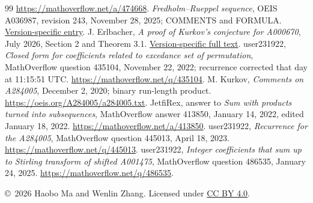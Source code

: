 \documentclass[11pt]{article}
\begin{document}
\begin{thebibliography}{99}
\url{https://mathoverflow.net/a/474668}.
 \emph{Fredholm--Rueppel sequence}, OEIS A036987,
revision 243, November 28, 2025; COMMENTS and FORMULA.
\href{https://raw.githubusercontent.com/oeis/oeisdata/d8ad22d9b98d2c427be8c6cd9f2672c600b8e3ae/seq/A036/A036987.seq}{Version-specific entry}.
 J. Erlbacher, \emph{A proof of Kurkov's conjecture for
A000670}, July 2026, Section 2 and Theorem 3.1.
\href{https://raw.githubusercontent.com/demonstrandum-research/artifacts/de462739d3afc6bfb3316d69a840ab4f75007aa9/papers/kurkov-a000670/note.pdf}{Version-specific full text}.
 user231922, \emph{Closed form for coefficients related
to excedance set of permutation}, MathOverflow question 435104,
November 22, 2022; recurrence corrected that day at 11:15:51 UTC.
\url{https://mathoverflow.net/q/435104}.
 M. Kurkov, \emph{Comments on A284005},
December 2, 2020; binary run-length product.
\url{https://oeis.org/A284005/a284005.txt}.
 JetfiRex, answer to \emph{Sum with products turned
into subsequences}, MathOverflow answer 413850, January 14, 2022,
edited January 18, 2022. \url{https://mathoverflow.net/a/413850}.
 user231922, \emph{Recurrence for the A284005},
MathOverflow question 445013, April 18, 2023.
\url{https://mathoverflow.net/q/445013}.
 user231922, \emph{Integer coefficients that sum up to
Stirling transform of shifted A001475}, MathOverflow question 486535,
January 24, 2025. \url{https://mathoverflow.net/q/486535}.
\end{thebibliography}
\noindent\small\copyright\ 2026 Haobo Ma and Wenlin Zhang.
Licensed under \href{https://creativecommons.org/licenses/by/4.0/}{CC BY 4.0}.
\end{document}
